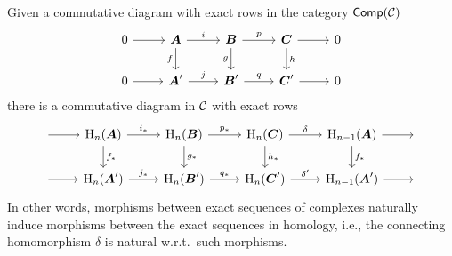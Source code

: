 \begin{prop}\label{naturality of connecting hom}
    Given a commutative diagram with exact rows in the category $\mathsf{Comp}(\mathcal{C})$
    \[\begin{tikzcd}
        0\arrow[r] & \bm{A}\arrow[r,"i"]\arrow[d,swap,"f"] & \bm{B} \arrow[r,"p"]\arrow[d,swap,"g"] & \bm{C}\arrow[d,"h"]\arrow[r] & 0 \\
       0\arrow[r] & \bm{A}'\arrow[r,"j"] & \bm{B}'\arrow[r,"q"] &\bm{C}' \arrow[r] &0
    \end{tikzcd}\]
    there is a commutative diagram in $\mathcal{C}$ with exact rows
    \[\begin{tikzcd}
        ~\arrow[r]& \rmH_n(\bm{A})\arrow[r,"i_\ast"]\arrow[d,"f_\ast"] & \rmH_n(\bm{B}) \arrow[r,"p_\ast"]\arrow[d,"g_\ast"] & \rmH_n(\bm{C})\arrow[d,"h_\ast"]\arrow[r,"\delta"] & \rmH_{n-1}(\bm{A})\arrow[d,"f_\ast"]\arrow[r]&~ \\
       ~\arrow[r] & \rmH_n(\bm{A}')\arrow[r,"j_\ast"] & \rmH_n(\bm{B}')\arrow[r,"q_\ast"] &\rmH_n(\bm{C}') \arrow[r,"\delta'"] &\rmH_{n-1}(\bm{A}')\arrow[r]&~ 
    \end{tikzcd}\]
    In other words, morphisms between exact sequences of complexes naturally induce morphisms between the exact sequences in homology, i.e., the connecting homomorphism $\delta$ is natural w.r.t.\ such morphisms.
\end{prop}
